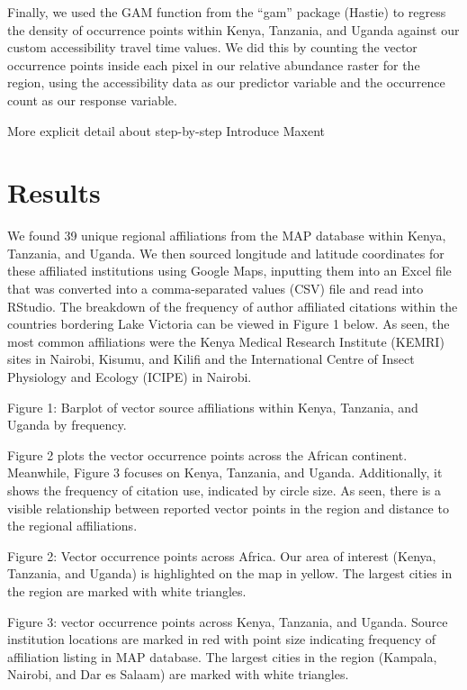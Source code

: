 \documentclass[sn-nature]{sn-jnl}%
\begin{document}
{Finally, we used the GAM function from the “gam” package (Hastie) to regress the density of occurrence points within Kenya, Tanzania, and Uganda against our custom accessibility travel time values. We did this by counting the vector occurrence points inside each pixel in our relative abundance raster for the region, using the accessibility data as our predictor variable and the occurrence count as our response variable. 

More explicit detail about step-by-step
Introduce Maxent


\section{Results}\label{results}
We found 39 unique regional affiliations from the MAP database within Kenya, Tanzania, and Uganda. We then sourced longitude and latitude coordinates for these affiliated institutions using Google Maps, inputting them into an Excel file that was converted into a comma-separated values (CSV) file and read into RStudio. The breakdown of the frequency of author affiliated citations within the countries bordering Lake Victoria can be viewed in Figure 1 below. As seen, the most common affiliations were the Kenya Medical Research Institute (KEMRI) sites in Nairobi, Kisumu, and Kilifi and the International Centre of Insect Physiology and Ecology (ICIPE) in Nairobi. 


Figure 1: Barplot of vector source affiliations within Kenya, Tanzania, and Uganda by frequency. 

Figure 2 plots the vector occurrence points across the African continent. Meanwhile, Figure 3 focuses on Kenya, Tanzania, and Uganda. Additionally, it shows the frequency of citation use, indicated by circle size. As seen, there is a visible relationship between reported vector points in the region and distance to the regional affiliations.  



Figure 2: Vector occurrence points across Africa. Our area of interest (Kenya, Tanzania, and Uganda) is highlighted on the map in yellow. The largest cities in the region are marked with white triangles. 



Figure 3: vector occurrence points across Kenya, Tanzania, and Uganda. Source institution locations are marked in red with point size indicating frequency of affiliation listing in MAP database. The largest cities in the region (Kampala, Nairobi, and Dar es Salaam) are marked with white triangles. 

}
\end{document}
